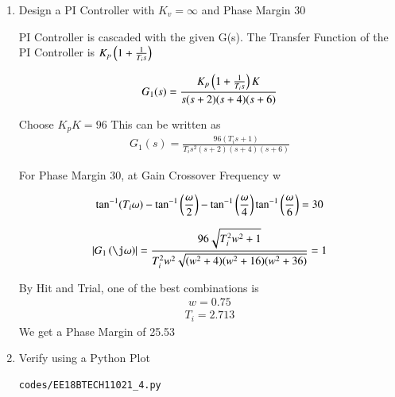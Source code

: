 \begin{enumerate}[label=\thesection.\arabic*.,ref=\thesection.\theenumi]
\item
Design a PI Controller with $K_{v} = \infty$ and Phase Margin 30\degree

\solution
PI Controller is cascaded with the given G(s).
The Transfer Function of the PI Controller is $K_{p}\left(1 + \frac{1}{T_{i}s}\right)$

\begin{align}
    G_{1}(s) = \frac{K_{p}\left(1 +  \frac{1}{T_{i}s}\right)K}{s(s+2)(s+4)(s+6)}
\end{align}

Choose $K_{p}K = 96$
This can be written as
\begin{align}
    G_{1}(s) = \frac{96(T_{i}s + 1)}{T_{i}s^2(s+2)(s+4)(s+6)}
\end{align}

For Phase Margin 30\degree, at Gain Crossover Frequency w

\begin{align}
    \tan^{-1}(T_{i}\omega) - \tan^{-1}\left(\frac{\omega}{2}\right) - \tan^{-1}\left(\frac{\omega}{4}\right)
    \tan^{-1}\left(\frac{\omega}{6}\right) = 30
\end{align}

\begin{align}
    \abs{G_{1}\brak{\j\omega}} = \frac{96\sqrt{T_{i}^2w^2 + 1}}{T_{i}^2w^2\sqrt{(w^2+4)(w^2 + 16)(w^2 + 36)}} = 1
\end{align}

By Hit and Trial, one of the best combinations is
\begin{align}
    w = 0.75
\end{align}
\begin{align}
    T_{i} = 2.713
\end{align}
We get a Phase Margin of 25.53\degree

\item
Verify using a Python Plot

\solution
\begin{lstlisting}
codes/EE18BTECH11021_4.py
\end{lstlisting}


\end{enumerate}

